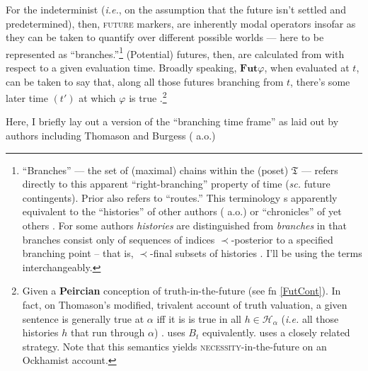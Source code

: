 \documentclass[12pt,dvipsnames]{report}
\begin{document}
For the indeterminist (\textit{i.e.}, on the assumption that the future isn't settled and predetermined), then, \textsc{future} markers, are inherently modal operators insofar as they can be taken to quantify over different possible worlds --- here to be represented as ``branches.''\footnote{``Branches'' --- the set of (maximal) chains within the (poset) $\mathfrak T$ --- refers directly to this apparent ``right-branching'' property of time (\textit{sc.} future contingents). Prior also refers to ``routes.'' This terminology s apparently equivalent to the ``histories'' of other authors (\citealp{Thomason1970,Dowty1977,Tedeschi1981,Belnap2001a} a.o.) or ``chronicles'' of yet others \citep{Øhrstrøm1995}. For some authors \textit{histories} are distinguished from \textit{branches} in that branches consist only of sequences of indices $ \prec $-posterior to a specified branching point -- that is, $ \prec $-final subsets of histories \citep[\textit{e.g.},][4]{Zanardo1996}. I'll be using the terms interchangeably.} (Potential) futures, then, are calculated from with respect to a given evaluation time. Broadly speaking, $ \mathbf{Fut} \varphi $, when evaluated at $ t $, can be taken to say that, along all those futures branching from $ t $, there's some later time $ (t') $ at which $ \varphi $ is true \citep[see][267]{Thomason1970}.\footnote{Given a \textbf{Peircian} conception of truth-in-the-future (see fn \ref{FutCont}). In fact, on Thomason's modified, trivalent account of truth valuation, a given sentence is generally true at $ \alpha $ iff it is is true in all $ h\in\mathcal H_\alpha $ (\textit{i.e.} all those histories $ h $ that run through $ \alpha $) \citeyearpar[274\textit{ff}]{Thomason1970}. \citet{Thomason1984} uses $\mathit B_t $ equivalently. \citet[247]{Tedeschi1981} uses a closely related strategy. Note that this semantics yields \textsc{necessity}-in-the-future on an Ockhamist account.} 

Here, I briefly lay out a version of the ``branching time frame'' as laid out by authors including Thomason \citeyearpar[\textit{e.g.},][\S 5]{Thomason1984} and Burgess (\citeyear[\textit{e.g.},][]{Burgess1978} a.o.) 


\end{document}
